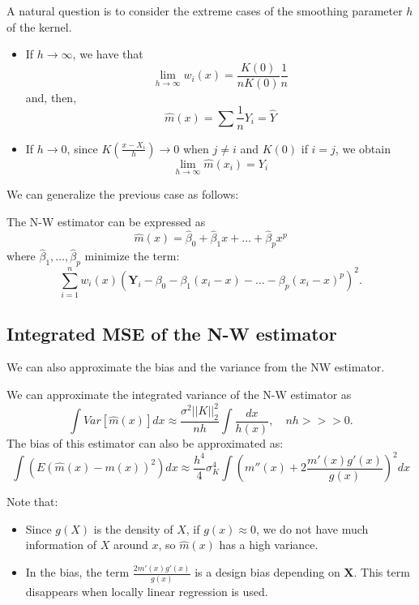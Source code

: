 A natural question is to consider the extreme cases of the smoothing parameter \(h\) of the kernel.
\begin{itemize}
\item If \(h \to \infty\), we have that
\[
\lim_{h \to \infty} w_i(x) = \frac{K(0)}{nK(0)} \frac{1}{n}
\]
and, then,
\[
\hat m(x) = \sum \frac{1}{n} Y_i = \hat Y
\]

\item If \(h \to 0\), since \( K \left(\frac{x-X_i}{h}\right) \to 0\) when \(j \neq i\) and \(K(0)\) if \(i = j\), we obtain 
\[
  \lim_{h \to \infty} \hat m(x_i) = Y_i
\]
\end{itemize}


We can generalize the previous case as follows:
\begin{nprop}
The N-W estimator can be expressed as
\[
\hat m(x) = \hat \beta_0 + \hat \beta_1 x + \dots + \hat \beta_p x^p  
\]
where \(\hat \beta_1,\dots,\hat \beta_p\) minimize the term:
\[
\sum_{i=1}^n w_i(x)(\mathbf{Y}_i - \beta_0 - \beta_1(x_i - x) - \dots - \beta_p(x_i - x)^p)^2.
\]
\end{nprop}

\subsection{Integrated MSE of the N-W estimator}


We can also approximate the bias and the variance from the NW estimator.

\begin{nprop}
  We can approximate the integrated variance of the N-W estimator as
  \[
    \int Var [\hat m(x)] dx \approx \frac{\sigma^2 ||K||_2^2}{nh} \int \frac{dx}{h(x)}, \quad nh >>> 0.
  \]
  The bias of this estimator can also be approximated as:
  \[
    \int (E(\hat m(x) - m(x))^{2})dx \approx \frac{h^{4}}{4}\sigma_{K}^{4} \int \left( m''(x) +2 \frac{m'(x)g'(x)}{g(x)}\right)^2 dx
  \]

\end{nprop}

Note that:
\begin{itemize}
\item Since \(g(X)\) is the density of \(X\), if \(g(x) \approx 0\), we do not have much information of \(X\) around \(x\), so \(\hat m(x)\) has a high variance.
\item In the bias, the term \( \frac{2m'(x)g'(x)}{g(x)}\) is a design bias depending on \(\mathbf{X}\). This term disappears when locally linear regression is used.
\end{itemize}

